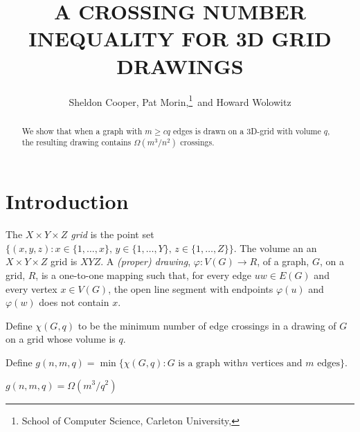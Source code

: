 \documentclass{patmorin}
\title{\MakeUppercase{A Crossing Number Inequality for 3D Grid Drawings}}
\author{Sheldon Cooper, Pat Morin,\thanks{School of Computer Science, Carleton University, \email{morin@scs.carleton.ca}}\ and Howard Wolowitz}
\begin{document}
\maketitle

\begin{abstract}
   We show that when a graph with $m\ge cq$ edges is drawn on a 3D-grid
   with volume $q$, the resulting drawing contains $\Omega(m^3/n^2)$
   crossings.
\end{abstract}

\section{Introduction}

The \emph{$X\times Y\times Z$ grid} is the point set $\{(x,y,z):
x\in\{1,\ldots,x\},\, y\in\{1,\ldots,Y\},\, z\in\{1,\ldots,Z\}\}$.
The volume an an $X\times Y\times Z$ grid is $XYZ$. A \emph{(proper)
drawing}, $\varphi:V(G)\rightarrow R$, of a graph, $G$, on a grid,
$R$, is a one-to-one mapping such that, for every edge $uw\in E(G)$ and
every vertex $x\in V(G)$, the open line segment with endpoints $\varphi(u)$ and $\varphi(w)$
does not contain $x$.

Define $\chi(G,q)$ to be the minimum number of edge crossings in a drawing of $G$ on a grid whose volume is $q$.

Define $g(n,m,q)=\min\{\chi(G,q):\text{$G$ is a graph with
$n$ vertices and $m$ edges}\}$.

\begin{thm}
  $g(n,m,q)=\Omega(m^3/q^2)$ 
\end{thm}
\end{document}
